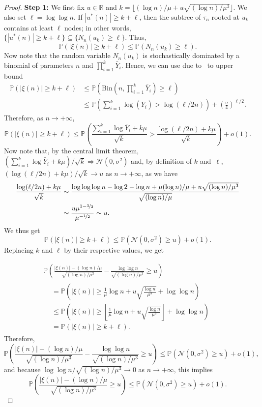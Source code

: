 \documentclass[10pt]{amsart}
\theoremstyle{definition}\newtheorem{defi}[theo]{Definition}\newtheorem{rema}[theo]{Remark}\newtheorem{exam}[theo]{Example}\newtheorem{exem}[theo]{Example}\newtheorem{nota}[theo]{Notation}
\newcommand{\bbP}{\mathbb{P}}
\newcommand{\bbR}{\mathbb{R}}
\newcommand{\clN}{\mathcal{N}}
\newcommand{\Bin}{\mathrm{Bin}}
\newcommand{\rme}{\mathrm{e}}
\begin{document}
\begin{proof}
{\bf Step 1:} We first fix $u\in\bbR$ and $k = \lfloor (\log n)/\mu + u\sqrt{(\log n)/\mu^3}\rfloor$. We also set $\ell = \log\log n$. If $|u^*(n)|\geq k+\ell$, then the subtree of $\tau_n$ rooted at $u_k$ contains at least $\ell$ nodes; in other words, $\{|u^*(n)|\geq k+\ell\}\subseteq \{N_n(u_k) \geq \ell\}$. Thus,
\[
\bbP(|\xi(n)|\geq k+\ell)
\leq \bbP(N_n(u_k)\geq \ell).
\]
Now note that the random variable $N_n(u_k)$ is stochastically dominated by a binomial of parameters $n$ and $\prod_{i=1}^k \bar Y_i.$ Hence, we can use due to~\cite[Lemma~4]{devroye-split} to upper bound
\begin{align*}
\bbP(|\xi(n)|\geq k+\ell)
&\leq \bbP\left(\Bin\left(n, \prod_{i=1}^k \bar Y_i\right)\geq \ell\right)\\
&\leq \bbP\left(\sum_{i=1}^k \log(\bar Y_i) > \log(\ell/2n)\right)+\left(\frac{\rme}4\right)^{\ell/2}.
\end{align*}
Therefore, as $n\to+\infty$,
\[
\bbP(|\xi(n)|\geq k+\ell)
\leq \bbP\left(\frac{\sum_{i=1}^k \log \bar Y_i +k\mu}{\sqrt k} > \frac{\log(\ell/2n)+k\mu}{\sqrt k}\right)+o(1).
\]
Now note that, by the central limit theorem, $(\sum_{i=1}^k \log \bar Y_i +k\mu)/\sqrt k \Rightarrow \clN(0,\sigma^2)$ and, by definition of $k$ and~$\ell$, $(\log(\ell/2n)+k\mu)/\sqrt k \to u$ as $n\to+\infty$, as we have
\begin{align*}
\frac{\log(\ell/2n)+k\mu}{\sqrt k} &\sim \frac{\log\log\log n - \log 2- \log n + \mu(\log n)/\mu+u\sqrt{(\log n)/\mu^3}}{\sqrt{(\log n)/\mu}}\\
&\sim \frac{u\mu^{1-\nicefrac32}}{\mu^{-\nicefrac12}} \sim u.
\end{align*}
We thus get
\[
\bbP(|\xi(n)|\geq k+\ell)\leq \bbP(\clN(0,\sigma^2)\geq u)+o(1).
\]
Replacing $k$ and $\ell$ by their respective values, we get

\begin{multline*}
\bbP\left(\frac{|\xi(n)|-(\log n)/\mu}{\sqrt{(\log n)/\mu^3}}-\frac{\log \log n}{\sqrt{(\log n)/\mu^3}}\geq u\right)\\
\begin{aligned}
&= \bbP\left(|\xi(n)| \geq \frac1\mu\log n + u\sqrt{\frac{\log n}{\mu^3}} + \log\log n\right)\\
&\leq \bbP\left(|\xi(n)| \geq \left\lfloor\frac1\mu\log n + u\sqrt{\frac{\log n}{\mu^3}}\right\rfloor+\log\log n\right)\\
&= \bbP(|\xi(n)|\geq k+\ell).
\end{aligned}
\end{multline*}
Therefore,
\[
\bbP\left(\frac{|\xi(n)|-(\log n)/\mu}{\sqrt{(\log n)/\mu^3}}-\frac{\log \log n}{\sqrt{(\log n)/\mu^3}}\geq u\right)
\leq \bbP(\clN(0,\sigma^2)\geq u)+o(1),
\]
and because $\log\log n/\sqrt{(\log n)/\mu^3}\to 0$ as $n\to+\infty$, this implies
\begin{equation}\label{eq:1st_bound_Dn}
\bbP\left(\frac{|\xi(n)|-(\log n)/\mu}{\sqrt{(\log n)/\mu^3}}\geq u\right)
\leq \bbP(\clN(0,\sigma^2)\geq u)+o(1).
\end{equation}


\end{proof}
\end{document}
